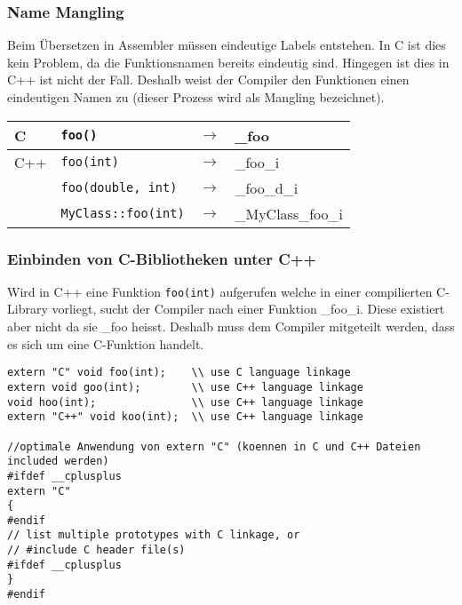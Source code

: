 \subsubsection{Name Mangling}
\begin{multicols}{2}
	Beim Übersetzen in Assembler müssen eindeutige Labels entstehen. In C ist dies kein Problem, da die Funktionsnamen bereits eindeutig sind. Hingegen ist dies in C++ ist nicht der Fall. Deshalb weist der Compiler den Funktionen einen eindeutigen Namen zu (dieser Prozess wird als Mangling bezeichnet).
\columnbreak
  \begin{tabular}{|l|lll|}
  \hline
    C   & {\lstinline!foo()!} & $\rightarrow$ & \_foo \\
  \hline
    C++ & {\lstinline!foo(int)!} & $\rightarrow$ & \_foo\_i \\
        & {\lstinline!foo(double, int)!} & $\rightarrow$ & \_foo\_d\_i \\
        & {\lstinline!MyClass::foo(int)!} & $\rightarrow$ & \_MyClass\_foo\_i \\
  \hline
  \end{tabular}
\end{multicols}

\subsubsection{Einbinden von C-Bibliotheken unter C++}
Wird in C++ eine Funktion \lstinline{foo(int)} aufgerufen welche in einer compilierten C-Library vorliegt, sucht der Compiler nach einer Funktion \_foo\_i. Diese existiert aber nicht da sie \_foo heisst. Deshalb muss dem Compiler mitgeteilt werden, dass es sich um eine C-Funktion handelt.\\

\begin{lstlisting}[style=Cpp]
extern "C" void foo(int);    \\ use C language linkage
extern void goo(int);        \\ use C++ language linkage
void hoo(int);               \\ use C++ language linkage
extern "C++" void koo(int);  \\ use C++ language linkage

//optimale Anwendung von extern "C" (koennen in C und C++ Dateien included werden)
#ifdef __cplusplus
extern "C"
{
#endif
// list multiple prototypes with C linkage, or
// #include C header file(s)
#ifdef __cplusplus
}
#endif
\end{lstlisting}

